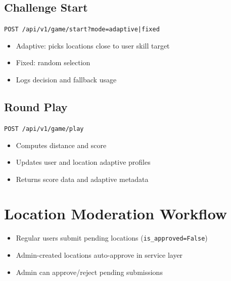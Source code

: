 \documentclass[12pt,a4paper]{article}
\begin{document}
\subsection{Challenge Start}
\texttt{POST /api/v1/game/start?mode=adaptive|fixed}
\begin{itemize}[noitemsep]
  \item Adaptive: picks locations close to user skill target
  \item Fixed: random selection
  \item Logs decision and fallback usage
\end{itemize}

\subsection{Round Play}
\texttt{POST /api/v1/game/play}
\begin{itemize}[noitemsep]
  \item Computes distance and score
  \item Updates user and location adaptive profiles
  \item Returns score data and adaptive metadata
\end{itemize}

\section{Location Moderation Workflow}
\begin{itemize}[noitemsep]
  \item Regular users submit pending locations (\texttt{is\_approved=False})
  \item Admin-created locations auto-approve in service layer
  \item Admin can approve/reject pending submissions
\end{itemize}
\end{document}
